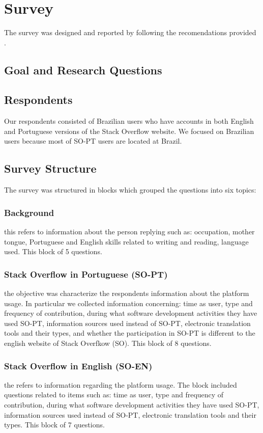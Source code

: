 \section{Survey}
The survey was designed and reported by following the recomendations provided \cite{Kitchenham2002}.
\subsection{Goal and Research Questions}

\subsection{Respondents}
Our respondents consisted of Brazilian users who have accounts in both English and Portuguese versions of the Stack Overflow website. We focused on Brazilian users because most of SO-PT users are located at Brazil.
\subsection{Survey Structure}
The survey was structured in blocks which grouped the questions into six topics:
\subsubsection{Background}  this refers to information about the person replying such as: occupation, mother tongue, Portuguese and English skills related to writing and reading, language used. This block of 5 questions.
\subsubsection{Stack Overflow in Portuguese (SO-PT)} the objective was characterize the respondents information about the platform usage. In particular we collected information concerning: time as user, type and frequency of contribution, during what software development activities they have used SO-PT, information sources used instead of SO-PT, electronic translation tools and their types, and whether the participation in SO-PT is different to the english website of Stack Overfkow (SO). This block of 8 questions.
\subsubsection{Stack Overflow in English (SO-EN)} the refers to information regarding the platform usage. The block included questions related to items such as: time as user, type and frequency of contribution, during what software development activities they have used SO-PT, information sources used instead of SO-PT, electronic translation tools and their types. This block of 7 questions.
